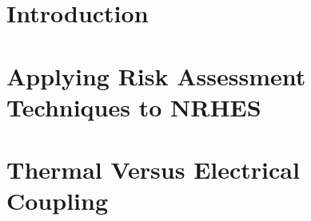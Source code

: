 \documentclass[12pt]{UIdahoMastersThesis}
\begin{document}
\mainmatter
\setcounter{secnumdepth}{3}	%

\clearpage


\chapter{Introduction}
\label{chapter:Introduction}



\chapter{Applying Risk Assessment Techniques to NRHES}
\label{Risk}



\chapter{Thermal Versus Electrical Coupling}
\label{TvsE}

\end{document}
